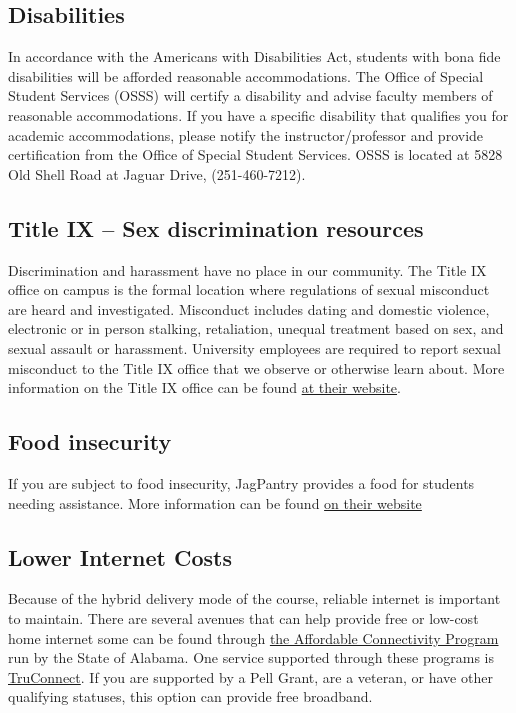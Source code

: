 \documentclass[11pt,]{article}
\begin{document}
\subsection{Disabilities}\label{disabilities}

In accordance with the Americans with Disabilities Act, students with
bona fide disabilities will be afforded reasonable accommodations. The
Office of Special Student Services (OSSS) will certify a disability and
advise faculty members of reasonable accommodations. If you have a
specific disability that qualifies you for academic accommodations,
please notify the instructor/professor and provide certification from
the Office of Special Student Services. OSSS is located at 5828 Old
Shell Road at Jaguar Drive, (251-460-7212).

\subsection{Title IX -- Sex discrimination
resources}\label{title-ix-sex-discrimination-resources}

Discrimination and harassment have no place in our community. The Title
IX office on campus is the formal location where regulations of sexual
misconduct are heard and investigated. Misconduct includes dating and
domestic violence, electronic or in person stalking, retaliation,
unequal treatment based on sex, and sexual assault or harassment.
University employees are required to report sexual misconduct to the
Title IX office that we observe or otherwise learn about. More
information on the Title IX office can be found
\href{https://www.southalabama.edu/departments/studentaffairs/titlenine/}{at
their website}.

\subsection{Food insecurity}\label{food-insecurity}

If you are subject to food insecurity, JagPantry provides a food for
students needing assistance. More information can be found
\href{https://www.southalabama.edu/departments/sga/foodpantry.html}{on
their website}

\subsection{Lower Internet Costs}\label{lower-internet-costs}

Because of the hybrid delivery mode of the course, reliable internet is
important to maintain. There are several avenues that can help provide
free or low-cost home internet some can be found through
\href{https://adeca.alabama.gov/affordable-connectivity-program/}{the
Affordable Connectivity Program} run by the State of Alabama. One
service supported through these programs is
\href{https://www.truconnect.com/findhelp}{TruConnect}. If you are
supported by a Pell Grant, are a veteran, or have other qualifying
statuses, this option can provide free broadband.
\end{document}
